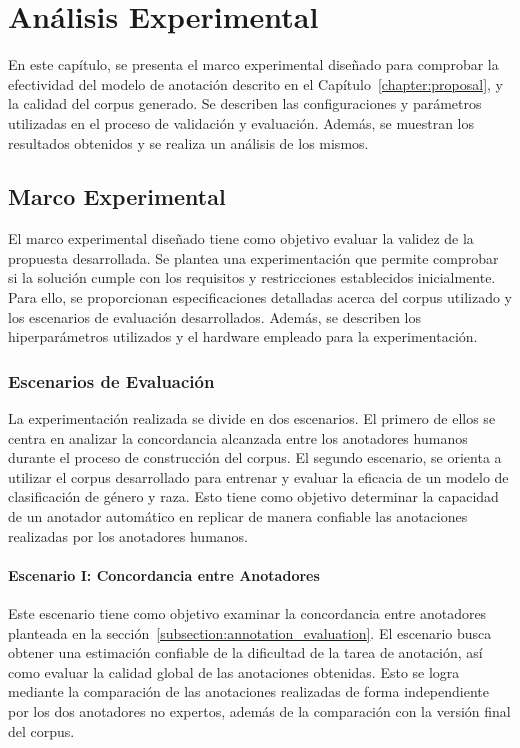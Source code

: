 \chapter{An\'alisis Experimental}\label{chapter:implementation}
En este cap\'itulo, se presenta el marco experimental dise\~nado para comprobar la efectividad del modelo de anotaci\'on 
descrito en el Cap\'itulo~\ref{chapter:proposal}, y la calidad del corpus generado. Se describen las configuraciones y 
par\'ametros utilizadas en el proceso de validaci\'on y evaluaci\'on. Adem\'as, se muestran los resultados obtenidos y 
se realiza un an\'alisis de los mismos.

\section{Marco Experimental}\label{section:experimental_framework}
El marco experimental dise\~nado tiene como objetivo evaluar la validez de la propuesta desarrollada. Se plantea 
una experimentaci\'on que permite comprobar si la soluci\'on cumple con los requisitos y restricciones establecidos inicialmente.
Para ello, se proporcionan especificaciones detalladas acerca del corpus utilizado y los escenarios de evaluaci\'on desarrollados.
Adem\'as, se describen los hiperpar\'ametros utilizados y el hardware empleado para la experimentaci\'on.

\subsection{Escenarios de Evaluaci\'on}
La experimentaci\'on realizada se divide en dos escenarios. El primero de ellos se centra en analizar la concordancia alcanzada entre 
los anotadores humanos durante el proceso de construcci\'on del corpus. El segundo escenario, se orienta a utilizar el corpus 
desarrollado para entrenar y evaluar la eficacia de un modelo de clasificaci\'on de g\'enero y raza. Esto tiene como objetivo determinar
la capacidad de un anotador autom\'atico en replicar de manera confiable las anotaciones realizadas por los anotadores humanos. 

\subsubsection{Escenario I: Concordancia entre Anotadores}
Este escenario tiene como objetivo examinar la concordancia entre anotadores planteada en la 
secci\'on~\ref{subsection:annotation_evaluation}. El escenario busca obtener una estimaci\'on confiable de la dificultad de la 
tarea de anotaci\'on, as\'i como evaluar la calidad global de las anotaciones obtenidas. Esto se logra mediante la comparaci\'on
de las anotaciones realizadas de forma independiente por los dos anotadores no expertos, adem\'as de la comparaci\'on con la 
versi\'on final del corpus.

